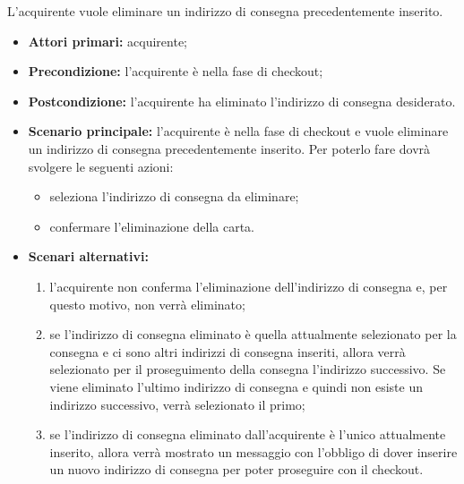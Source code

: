 
L'acquirente vuole eliminare un indirizzo di consegna precedentemente inserito.
\begin{itemize}
    \item \textbf{Attori primari:} acquirente;
    \item \textbf{Precondizione:}  l'acquirente è nella fase di checkout;
    \item \textbf{Postcondizione:} l'acquirente ha eliminato l'indirizzo di consegna desiderato.
    \item \textbf{Scenario principale:} l'acquirente è nella fase di checkout e vuole eliminare un indirizzo di consegna precedentemente inserito. Per poterlo fare dovrà svolgere le seguenti azioni:
    \begin{itemize}
        \item seleziona l'indirizzo di consegna da eliminare;
        \item confermare l'eliminazione della carta.
    \end{itemize}
    \item \textbf{Scenari alternativi:}
    \begin{enumerate}[label=\lett]
        \item l'acquirente non conferma l'eliminazione dell'indirizzo di consegna e, per questo motivo, non verrà eliminato;
        \item se l'indirizzo di consegna eliminato è quella attualmente selezionato per la consegna e ci sono altri indirizzi di consegna inseriti, allora verrà selezionato per il proseguimento della consegna l'indirizzo successivo. Se viene eliminato l'ultimo indirizzo di consegna e quindi non esiste un indirizzo successivo, verrà selezionato il primo;
        \item se l'indirizzo di consegna eliminato dall'acquirente è l'unico attualmente inserito, allora verrà mostrato un messaggio con l'obbligo di dover inserire un nuovo indirizzo di consegna per poter proseguire con il checkout.
    \end{enumerate}
\end{itemize}

